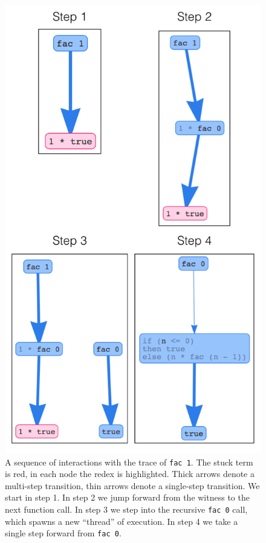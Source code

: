 \begin{figure}[t]
\centering
\includegraphics[width=\linewidth]{fac-steps.png}
\caption{A sequence of interactions with the trace of
  \texttt{fac 1}. The stuck term is red, in each node the redex is
  highlighted. Thick arrows denote a multi-step transition, thin arrows
  denote a single-step transition. We start in step 1. In step 2 we jump
  forward from the witness to the next function call. In step 3 we step
  into the recursive \texttt{fac 0} call, which spawns a new ``thread''
  of execution. In step 4 we take a single step forward from
  \texttt{fac 0}.}
\label{fig:nanomaly-factorial}
\end{figure}
